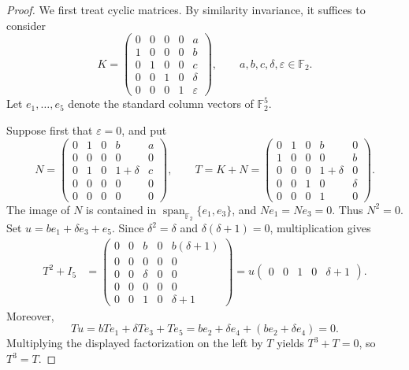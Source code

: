 \documentclass[12pt]{amsart}
\theoremstyle{remark}
\numberwithin{equation}{section}
\theoremstyle{definition}
\newcommand{\F}{\mathbb F}
\newcommand{\Id}{I}
\begin{document}
\begin{proof}
We first treat cyclic matrices. By similarity invariance, it suffices to consider
\[
 K=\begin{pmatrix}
 0&0&0&0&a\\
 1&0&0&0&b\\
 0&1&0&0&c\\
 0&0&1&0&\delta\\
 0&0&0&1&\varepsilon
 \end{pmatrix},
 \qquad a,b,c,\delta,\varepsilon\in\F_2.
\]
Let $e_1,\ldots,e_5$ denote the standard column vectors of $\F_2^5$.

Suppose first that $\varepsilon=0$, and put
\[
 N=\begin{pmatrix}
 0&1&0&b&a\\
 0&0&0&0&0\\
 0&1&0&1+\delta&c\\
 0&0&0&0&0\\
 0&0&0&0&0
 \end{pmatrix},
 \qquad
 T=K+N=\begin{pmatrix}
 0&1&0&b&0\\
 1&0&0&0&b\\
 0&0&0&1+\delta&0\\
 0&0&1&0&\delta\\
 0&0&0&1&0
 \end{pmatrix}.
\]
The image of $N$ is contained in $\operatorname{span}_{\F_2}\{e_1,e_3\}$, and $Ne_1=Ne_3=0$. Thus $N^2=0$. Set $u=be_1+\delta e_3+e_5$. Since $\delta^2=\delta$ and $\delta(\delta+1)=0$, multiplication gives
\[
\begin{aligned}
 T^2+\Id_5&=
 \begin{pmatrix}
 0&0&b&0&b(\delta+1)\\
 0&0&0&0&0\\
 0&0&\delta&0&0\\
 0&0&0&0&0\\
 0&0&1&0&\delta+1
 \end{pmatrix}
 =u\begin{pmatrix}0&0&1&0&\delta+1\end{pmatrix}.
\end{aligned}
\]
Moreover,
\[
 Tu=bTe_1+\delta Te_3+Te_5
 =be_2+\delta e_4+(be_2+\delta e_4)=0.
\]
Multiplying the displayed factorization on the left by $T$ yields $T^3+T=0$, so $T^3=T$.


\end{proof}
\end{document}
